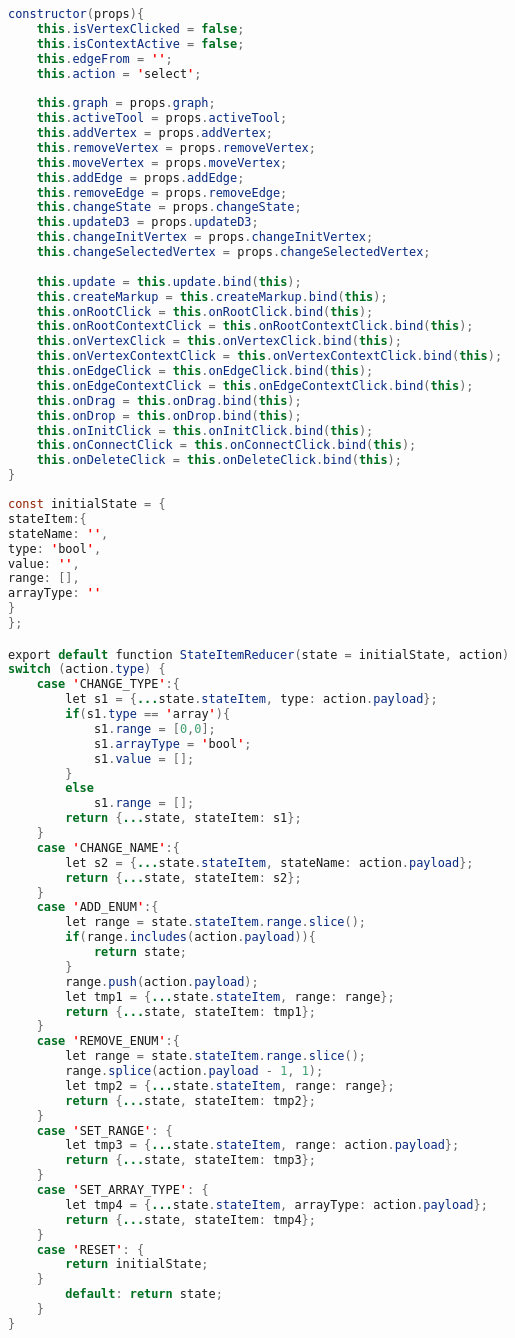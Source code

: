 \begin{lstlisting}[language=Java, 
label=lst:url_assign, 
caption={Конструктор класса D3graph.}]
constructor(props){
	this.isVertexClicked = false;
	this.isContextActive = false;
	this.edgeFrom = '';
	this.action = 'select';
	
	this.graph = props.graph;
	this.activeTool = props.activeTool;
	this.addVertex = props.addVertex;
	this.removeVertex = props.removeVertex;
	this.moveVertex = props.moveVertex;
	this.addEdge = props.addEdge;
	this.removeEdge = props.removeEdge;
	this.changeState = props.changeState;
	this.updateD3 = props.updateD3;
	this.changeInitVertex = props.changeInitVertex;
	this.changeSelectedVertex = props.changeSelectedVertex;
	
	this.update = this.update.bind(this);
	this.createMarkup = this.createMarkup.bind(this);
	this.onRootClick = this.onRootClick.bind(this);
	this.onRootContextClick = this.onRootContextClick.bind(this);
	this.onVertexClick = this.onVertexClick.bind(this);
	this.onVertexContextClick = this.onVertexContextClick.bind(this);
	this.onEdgeClick = this.onEdgeClick.bind(this);
	this.onEdgeContextClick = this.onEdgeContextClick.bind(this);
	this.onDrag = this.onDrag.bind(this);
	this.onDrop = this.onDrop.bind(this);
	this.onInitClick = this.onInitClick.bind(this);
	this.onConnectClick = this.onConnectClick.bind(this);
	this.onDeleteClick = this.onDeleteClick.bind(this);
}
\end{lstlisting}

\begin{lstlisting}[language=Java, 
label=lst:url_assign, 
caption={Пример сгенерированного SMV-кода.}]
const initialState = {
stateItem:{
stateName: '',
type: 'bool',
value: '',
range: [],
arrayType: ''
}
};

export default function StateItemReducer(state = initialState, action) {
switch (action.type) {
	case 'CHANGE_TYPE':{
		let s1 = {...state.stateItem, type: action.payload};
		if(s1.type == 'array'){
			s1.range = [0,0];
			s1.arrayType = 'bool';
			s1.value = [];
		}
		else
			s1.range = [];
		return {...state, stateItem: s1};
	}
	case 'CHANGE_NAME':{
		let s2 = {...state.stateItem, stateName: action.payload};
		return {...state, stateItem: s2};
	}
	case 'ADD_ENUM':{
		let range = state.stateItem.range.slice();
		if(range.includes(action.payload)){
			return state;
		}
		range.push(action.payload);
		let tmp1 = {...state.stateItem, range: range};
		return {...state, stateItem: tmp1};
	}
	case 'REMOVE_ENUM':{
		let range = state.stateItem.range.slice();
		range.splice(action.payload - 1, 1);
		let tmp2 = {...state.stateItem, range: range};
		return {...state, stateItem: tmp2};
	}
	case 'SET_RANGE': {
		let tmp3 = {...state.stateItem, range: action.payload};
		return {...state, stateItem: tmp3};
	}
	case 'SET_ARRAY_TYPE': {
		let tmp4 = {...state.stateItem, arrayType: action.payload};
		return {...state, stateItem: tmp4};
	}
	case 'RESET': {
		return initialState;
	}
		default: return state;
	}
}
\end{lstlisting}

